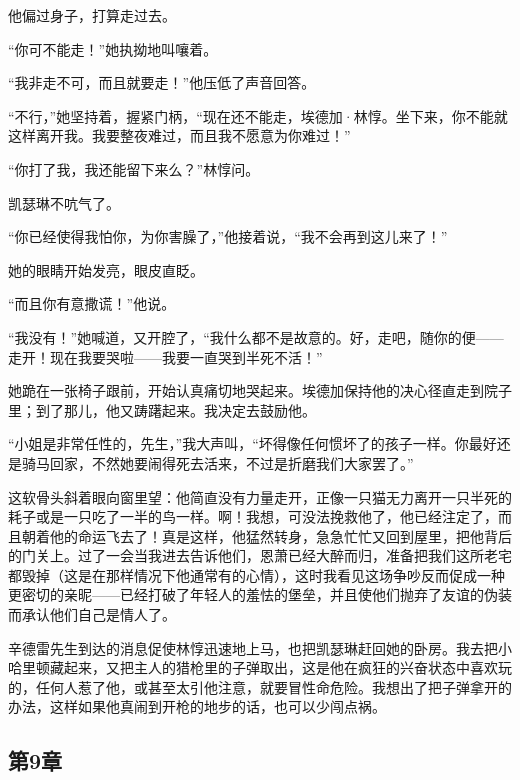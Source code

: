 \par 他偏过身子，打算走过去。
\par “你可不能走！”她执拗地叫嚷着。
\par “我非走不可，而且就要走！”他压低了声音回答。
\par “不行，”她坚持着，握紧门柄，“现在还不能走，埃德加·林惇。坐下来，你不能就这样离开我。我要整夜难过，而且我不愿意为你难过！”
\par “你打了我，我还能留下来么？”林惇问。
\par 凯瑟琳不吭气了。
\par “你已经使得我怕你，为你害臊了，”他接着说，“我不会再到这儿来了！”
\par 她的眼睛开始发亮，眼皮直眨。
\par “而且你有意撒谎！”他说。
\par “我没有！”她喊道，又开腔了，“我什么都不是故意的。好，走吧，随你的便——走开！现在我要哭啦——我要一直哭到半死不活！”
\par 她跪在一张椅子跟前，开始认真痛切地哭起来。埃德加保持他的决心径直走到院子里；到了那儿，他又踌躇起来。我决定去鼓励他。
\par “小姐是非常任性的，先生，”我大声叫，“坏得像任何惯坏了的孩子一样。你最好还是骑马回家，不然她要闹得死去活来，不过是折磨我们大家罢了。”
\par 这软骨头斜着眼向窗里望：他简直没有力量走开，正像一只猫无力离开一只半死的耗子或是一只吃了一半的鸟一样。啊！我想，可没法挽救他了，他已经注定了，而且朝着他的命运飞去了！真是这样，他猛然转身，急急忙忙又回到屋里，把他背后的门关上。过了一会当我进去告诉他们，恩萧已经大醉而归，准备把我们这所老宅都毁掉（这是在那样情况下他通常有的心情），这时我看见这场争吵反而促成一种更密切的亲昵——已经打破了年轻人的羞怯的堡垒，并且使他们抛弃了友谊的伪装而承认他们自己是情人了。
\par 辛德雷先生到达的消息促使林惇迅速地上马，也把凯瑟琳赶回她的卧房。我去把小哈里顿藏起来，又把主人的猎枪里的子弹取出，这是他在疯狂的兴奋状态中喜欢玩的，任何人惹了他，或甚至太引他注意，就要冒性命危险。我想出了把子弹拿开的办法，这样如果他真闹到开枪的地步的话，也可以少闯点祸。


\subsection{第9章}

